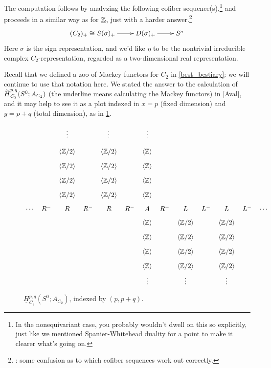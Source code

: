 The computation follows by analyzing the following cofiber sequence(s),\footnote{In the nonequivariant case, you
probably wouldn't dwell on this so explicitly, just like we mentioned Spanier-Whitehead
duality for a point to make it clearer what's going on.} and proceeds in a similar
way as for $\underline{\mathbb Z}$, just with a harder answer.\footnote{\TODO: some confusion as to which cofiber sequences
work out correctly.}
\begin{gather}
\label{sigmacofib}
\xymatrix{
	(C_2)_+\cong S(\sigma)_+\ar[r] & D(\sigma)_+\ar[r] & S^\sigma
}
\end{gather}
Here $\sigma$ is the sign representation, and we'd like $\eta$ to be the nontrivial irreducible complex
$C_2$-representation, regarded as a two-dimensional real representation.

Recall that we defined a zoo of Mackey functors for $C_2$ in \cref{best_bestiary}: we will continue to use that
notation here. We stated the answer to the calculation of $\underline{\widetilde H}_{C_2}^{p,q}(S^0;A_{C_2})$ (the underline
means calculating the Mackey functors) in \cref{Aval}, and it may help to see it as a plot indexed in $x = p$
(fixed dimension) and $y = p+q$ (total dimension), as in \cref{ROgdiag}.
\begin{figure}[h!]
\[\xymatrix@R=0.2cm@C=0.2cm{ %
	& & \vdots     && \vdots     && \vdots\\
	& & \ang{\Z/2} && \ang{\Z/2} && \ang\Z\\
	& & \ang{\Z/2} && \ang{\Z/2} && \ang\Z\\
	& & \ang{\Z/2} && \ang{\Z/2} && \ang\Z\\
	& & \ang{\Z/2} && \ang{\Z/2} && \ang\Z\\
	\dotsb & R^- & R & R^- & R & R^- & A & R^- & L & L^- & L & L^- & \dotsb\\
	& & & & & & \ang\Z && \ang{\Z/2} && \ang{\Z/2}\\
	& & & & & & \ang\Z && \ang{\Z/2} && \ang{\Z/2}\\
	& & & & & & \ang\Z && \ang{\Z/2} && \ang{\Z/2}\\
	& & & & & & \ang\Z && \ang{\Z/2} && \ang{\Z/2}\\
	& & & & & & \vdots && \vdots && \vdots
}\]
\caption{$\underline H_{C_2}^{p,q}(S^0;A_{C_2})$, indexed by $(p,p+q)$.}
\label{ROgdiag}
\end{figure}

